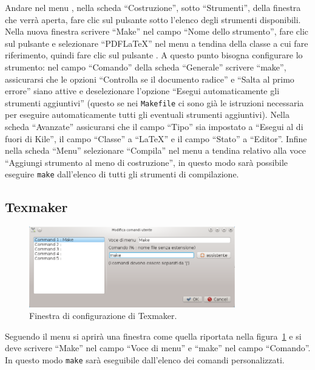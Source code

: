 Andare nel menu , nella scheda
``Costruzione'', sotto ``Strumenti'', della finestra che verrà aperta, fare clic
sul pulsante  sotto l'elenco degli strumenti disponibili.
Nella nuova finestra scrivere ``Make'' nel campo ``Nome dello strumento'', fare
clic sul pulsante  e selezionare ``PDFLaTeX'' nel menu a
tendina della classe a cui fare riferimento, quindi fare clic sul pulsante
.  A questo punto bisogna configurare lo strumento: nel campo
``Comando'' della scheda ``Generale'' scrivere ``make'', assicurarsi che le
opzioni ``Controlla se il documento radice'' e ``Salta al primo errore'' siano
attive e deselezionare l'opzione ``Esegui automaticamente gli strumenti
aggiuntivi'' (questo se nei \texttt{Makefile} ci sono già le istruzioni
necessaria per eseguire automaticamente tutti gli eventuali strumenti
aggiuntivi).  Nella scheda ``Avanzate'' assicurarsi che il campo ``Tipo'' sia
impostato a ``Esegui al di fuori di Kile'', il campo ``Classe'' a ``LaTeX'' e il
campo ``Stato'' a ``Editor''.  Infine nella scheda ``Menu'' selezionare
``Compila'' nel menu a tendina relativo alla voce ``Aggiungi strumento al meno
di costruzione'', in questo modo sarà possibile eseguire \texttt{make}
dall'elenco di tutti gli strumenti di compilazione.

\subsection{Texmaker}
\label{sec:texmaker}

\begin{figure}
  \centering
  \includegraphics[width=0.8\textwidth]{figure/texmaker}
  \caption{Finestra di configurazione di Texmaker.}
  \label{fig:texmaker}
\end{figure}
Seguendo il menu
 si aprirà una
finestra come quella riportata nella figura~\ref{fig:texmaker} e si deve
scrivere ``Make'' nel campo ``Voce di menu'' e ``make'' nel campo ``Comando''.
In questo modo \texttt{make} sarà eseguibile dall'elenco dei comandi
personalizzati.


